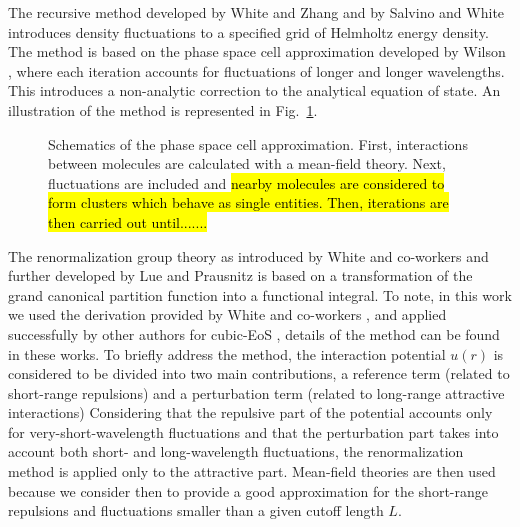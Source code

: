 \documentclass[preprint,12pt,3p]{elsarticle}
\begin{document}
The recursive method developed by White and Zhang \cite{white1993renormalization, white1995renormalization, white1998renormalization} and by Salvino and White \citep{salvino1992calculation} introduces density fluctuations to a specified grid of Helmholtz energy density.
The method is based on the phase space cell approximation developed by Wilson \cite{wilson1971renormalization, wilson1971brenormalization}, where each iteration accounts for fluctuations of longer and longer wavelengths.
This introduces a non-analytic correction to the analytical equation of state.
An illustration of the method is represented in Fig.~\ref{fig:schematics}.

\begin{figure}[h!]
\centering
\captionsetup{justification=centering}
\caption{Schematics of the phase space cell approximation. First, interactions between molecules are calculated with a mean-field theory. Next, fluctuations are included and \hl{nearby molecules are considered to form clusters which behave as single entities. Then, iterations are then carried out until.......}}
\label{fig:schematics}
\end{figure}

The renormalization group theory as introduced by White and co-workers \cite{white1993renormalization,white1995renormalization,white1998renormalization} and further developed by Lue and Prausnitz \cite{lue1998renormalization, lue1998brenormalization} is based on a transformation of the grand canonical partition function into a functional integral.
To note, in this work we used the derivation provided by White and co-workers \cite{white1993renormalization,white1995renormalization,white1998renormalization}, and applied successfully by other authors for cubic-EoS \cite{cai2006vapor,pcm2017application,xu2010crossover,xu2011prediction}, details of the method can be found in these works.
To briefly address the method, the interaction potential $u(r)$ is considered to be divided into two main contributions, a reference term (related to short-range repulsions) and a perturbation term (related to long-range attractive interactions)
Considering that the repulsive part of the potential accounts only for very-short-wavelength fluctuations and that the perturbation part takes into account both short- and long-wavelength fluctuations, the renormalization method is applied only to the attractive part.
Mean-field theories are then used because we consider then to provide a good approximation for the short-range repulsions and fluctuations smaller than a given cutoff length $L$.
\end{document}
